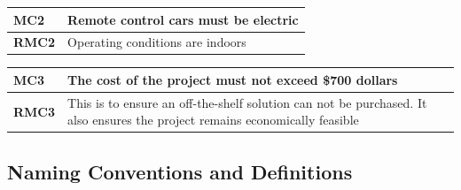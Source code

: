 \documentclass [11pt]{article}
\begin{document}
\begin{longtable}{| p{ } | p{ } | }\hline 

\textbf{MC2}& \textbf{Remote control cars must be electric}\\ \hline 
\textbf{RMC2} & Operating conditions are indoors  \\ \hline 

\end{longtable}

\begin{longtable}{| p{ } | p{ } | }\hline 
\textbf{MC3} & \textbf{The cost of the project must not exceed \$700 dollars} \\ \hline
\textbf{RMC3} & This is to ensure an off-the-shelf solution can not be purchased. It also ensures the project remains economically feasible \\ \hline
\end{longtable}


\subsection{Naming Conventions and Definitions}
\end{document}

